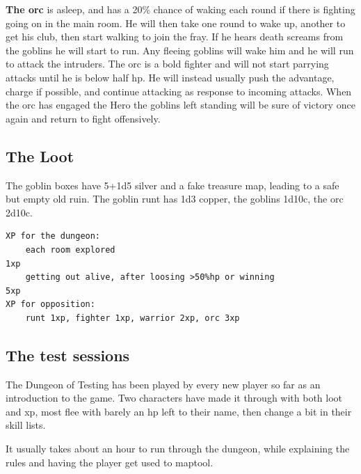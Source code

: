 \textbf{The orc} is asleep, and has a 20\% chance of waking each round if there is fighting going on in the main room. He will then take one round to wake up, another to get his club, then start walking to join the fray. If he hears death screams from the goblins he will start to run. Any fleeing goblins will wake him and he will run to attack the intruders. The orc is a bold fighter and will not start parrying attacks until he is below half hp. He will instead usually push the advantage, charge if possible, and continue attacking as response to incoming attacks.
When the orc has engaged the Hero the goblins left standing will be sure of victory once again and return to fight offensively.


\subsection*{The Loot}

The goblin boxes have 5+1d5 silver and a fake treasure map, leading to a safe but empty old ruin. The goblin runt has 1d3 copper, the goblins 1d10c, the orc 2d10c.\\
\begin{samepage} \small \begin{verbatim}
XP for the dungeon:
    each room explored                                                     1xp
    getting out alive, after loosing >50%hp or winning                     5xp
XP for opposition:
    runt 1xp, fighter 1xp, warrior 2xp, orc 3xp
\end{verbatim} \end{samepage} \normalsize


\subsection*{The test sessions}

The Dungeon of Testing has been played by every new player so far as an introduction to the game. Two characters have made it through with both loot and xp, most flee with barely an hp left to their name, then change a bit in their skill lists.

It usually takes about an hour to run through the dungeon, while explaining the rules and having the player get used to maptool.










